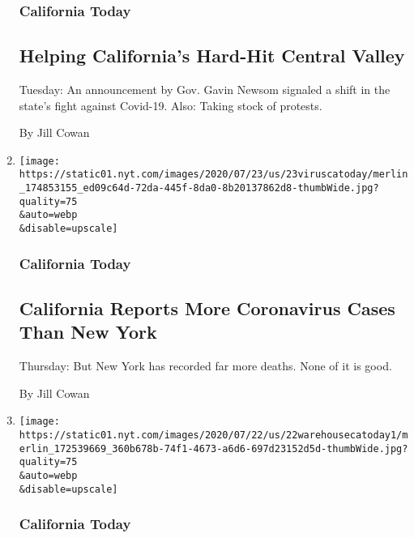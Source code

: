 \begin{enumerate}
  \hypertarget{california-today-3}{%
  \subsubsection{California Today}\label{california-today-3}}

  \hypertarget{helping-californias-hard-hit-central-valley}{%
  \subsection{Helping California's Hard-Hit Central
  Valley}\label{helping-californias-hard-hit-central-valley}}

  Tuesday: An announcement by Gov. Gavin Newsom signaled a shift in the
  state's fight against Covid-19. Also: Taking stock of protests.

  By Jill Cowan
\item
  \href{/2020/07/23/us/california-coronavirus-new-york-cases.html}{}

  \texttt{[image: https://static01.nyt.com/images/2020/07/23/us/23viruscatoday/merlin\_174853155\_ed09c64d-72da-445f-8da0-8b20137862d8-thumbWide.jpg?quality=75\\\&auto=webp\\\&disable=upscale]}

  \hypertarget{california-today-4}{%
  \subsubsection{California Today}\label{california-today-4}}

  \hypertarget{california-reports-more-coronavirus-cases-than-new-york}{%
  \subsection{California Reports More Coronavirus Cases Than New
  York}\label{california-reports-more-coronavirus-cases-than-new-york}}

  Thursday: But New York has recorded far more deaths. None of it is
  good.

  By Jill Cowan
\item
  \href{/2020/07/22/us/coronavirus-ca-warehouse-workers.html}{}

  \texttt{[image: https://static01.nyt.com/images/2020/07/22/us/22warehousecatoday1/merlin\_172539669\_360b678b-74f1-4673-a6d6-697d23152d5d-thumbWide.jpg?quality=75\\\&auto=webp\\\&disable=upscale]}

  \hypertarget{california-today-5}{%
  \subsubsection{California Today}\label{california-today-5}}


\end{enumerate}
